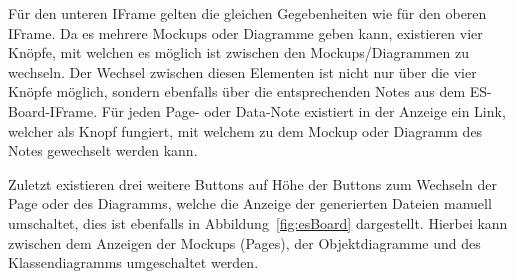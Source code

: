 Für den unteren IFrame gelten die gleichen Gegebenheiten wie für den oberen IFrame.
Da es mehrere Mockups oder Diagramme geben kann, existieren vier Knöpfe, mit welchen es möglich ist zwischen den Mockups/Diagrammen zu wechseln.
Der Wechsel zwischen diesen Elementen ist nicht nur über die vier Knöpfe möglich, sondern ebenfalls über die entsprechenden Notes aus dem \ac{ES}-Board-IFrame.
Für jeden Page- oder Data-Note existiert in der Anzeige ein Link, welcher als Knopf fungiert, mit welchem zu dem Mockup oder Diagramm des Notes gewechselt werden kann.

Zuletzt existieren drei weitere Buttons auf Höhe der Buttons zum Wechseln der Page oder des Diagramms, welche die Anzeige der generierten Dateien manuell umschaltet,
dies ist ebenfalls in Abbildung~\ref{fig:esBoard} dargestellt.
Hierbei kann zwischen dem Anzeigen der Mockups (Pages), der Objektdiagramme und des Klassendiagramms umgeschaltet werden.
